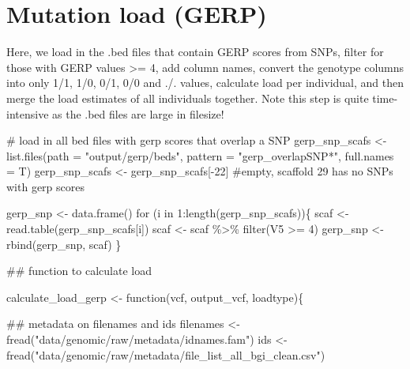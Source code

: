 \documentclass[
  letterpaper,
  DIV=11,
  numbers=noendperiod]{scrreprt}
\newenvironment{Shaded}{}{}
\newcommand{\AttributeTok}[1]{\textcolor[rgb]{0.84,0.23,0.29}{#1}}
\newcommand{\CommentTok}[1]{\textcolor[rgb]{0.42,0.45,0.49}{#1}}
\newcommand{\ControlFlowTok}[1]{\textcolor[rgb]{0.84,0.23,0.29}{#1}}
\newcommand{\DecValTok}[1]{\textcolor[rgb]{0.00,0.36,0.77}{#1}}
\newcommand{\DocumentationTok}[1]{\textcolor[rgb]{0.42,0.45,0.49}{#1}}
\newcommand{\FunctionTok}[1]{\textcolor[rgb]{0.44,0.26,0.76}{#1}}
\newcommand{\NormalTok}[1]{\textcolor[rgb]{0.14,0.16,0.18}{#1}}
\newcommand{\OtherTok}[1]{\textcolor[rgb]{0.44,0.26,0.76}{#1}}
\newcommand{\SpecialCharTok}[1]{\textcolor[rgb]{0.00,0.36,0.77}{#1}}
\newcommand{\StringTok}[1]{\textcolor[rgb]{0.01,0.18,0.38}{#1}}
\begin{document}
\hypertarget{mutation-load-gerp}{%
\section{Mutation load (GERP)}\label{mutation-load-gerp}}

Here, we load in the .bed files that contain GERP scores from SNPs,
filter for those with GERP values \textgreater= 4, add column names,
convert the genotype columns into only 1/1, 1/0, 0/1, 0/0 and ./.
values, calculate load per individual, and then merge the load estimates
of all individuals together. Note this step is quite time-intensive as
the .bed files are large in filesize!

\begin{Shaded}
\begin{Highlighting}[]
\CommentTok{\# load in all bed files with gerp scores that overlap a SNP}
\NormalTok{gerp\_snp\_scafs }\OtherTok{\textless{}{-}} \FunctionTok{list.files}\NormalTok{(}\AttributeTok{path =} \StringTok{"output/gerp/beds"}\NormalTok{, }\AttributeTok{pattern =} \StringTok{"gerp\_overlapSNP*"}\NormalTok{, }\AttributeTok{full.names =}\NormalTok{ T)}
\NormalTok{gerp\_snp\_scafs }\OtherTok{\textless{}{-}}\NormalTok{ gerp\_snp\_scafs[}\SpecialCharTok{{-}}\DecValTok{22}\NormalTok{] }\CommentTok{\#empty, scaffold 29 has no SNPs with gerp scores}

\NormalTok{gerp\_snp }\OtherTok{\textless{}{-}} \FunctionTok{data.frame}\NormalTok{()}
\ControlFlowTok{for}\NormalTok{ (i }\ControlFlowTok{in} \DecValTok{1}\SpecialCharTok{:}\FunctionTok{length}\NormalTok{(gerp\_snp\_scafs))\{}
\NormalTok{  scaf }\OtherTok{\textless{}{-}} \FunctionTok{read.table}\NormalTok{(gerp\_snp\_scafs[i])}
\NormalTok{  scaf }\OtherTok{\textless{}{-}}\NormalTok{ scaf }\SpecialCharTok{\%\textgreater{}\%} \FunctionTok{filter}\NormalTok{(V5 }\SpecialCharTok{\textgreater{}=} \DecValTok{4}\NormalTok{)}
\NormalTok{  gerp\_snp }\OtherTok{\textless{}{-}} \FunctionTok{rbind}\NormalTok{(gerp\_snp, scaf)}
\NormalTok{\}}

\DocumentationTok{\#\# function to calculate load}

\NormalTok{calculate\_load\_gerp }\OtherTok{\textless{}{-}} \ControlFlowTok{function}\NormalTok{(vcf, output\_vcf, loadtype)\{}
  
  \DocumentationTok{\#\# metadata on filenames and ids}
\NormalTok{  filenames }\OtherTok{\textless{}{-}} \FunctionTok{fread}\NormalTok{(}\StringTok{"data/genomic/raw/metadata/idnames.fam"}\NormalTok{)}
\NormalTok{  ids }\OtherTok{\textless{}{-}} \FunctionTok{fread}\NormalTok{(}\StringTok{"data/genomic/raw/metadata/file\_list\_all\_bgi\_clean.csv"}\NormalTok{)}
  

\end{Highlighting}
\end{Shaded}
\end{document}
